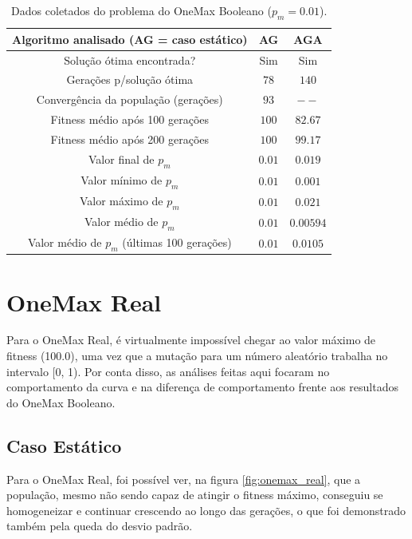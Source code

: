 \begin{table}
\caption{Dados coletados do problema do OneMax Booleano ($p_m = 0.01$).}
\label{tab:onemax_boolean}

\center
\begin{tabular}{|c|cc|}
	\hline
	Algoritmo analisado (AG = caso estático)	& AG		& AGA		\\
	\hline
	Solução ótima encontrada?					& Sim		& Sim		\\
	Gerações p/solução ótima					& $78$		& $140$		\\
	Convergência da população (gerações)		& $93$		& $--$		\\
	Fitness médio após 100 gerações				& $100$		& $82.67$	\\
	Fitness médio após 200 gerações 			& $100$		& $99.17$	\\
	Valor final de $p_m$						& $0.01$ 	& $0.019$	\\
	Valor mínimo de $p_m$						& $0.01$	& $0.001$	\\
	Valor máximo de $p_m$						& $0.01$	& $0.021$	\\
	Valor médio de $p_m$						& $0.01$	& $0.00594$	\\
	Valor médio de $p_m$ (últimas 100 gerações)	& $0.01$	& $0.0105$	\\
	\hline
\end{tabular}
\end{table}

\section{OneMax Real}

Para o OneMax Real, é virtualmente impossível chegar ao valor máximo de fitness (100.0), uma vez que a mutação para um número aleatório trabalha no intervalo [0, 1). Por conta disso, as análises feitas aqui focaram no comportamento da curva e na diferença de comportamento frente aos resultados do OneMax Booleano.

\subsection{Caso Estático}

Para o OneMax Real, foi possível ver, na figura \ref{fig:onemax_real}, que a população, mesmo não sendo capaz de atingir o fitness máximo, conseguiu se homogeneizar e continuar crescendo ao longo das gerações, o que foi demonstrado também pela queda do desvio padrão.

